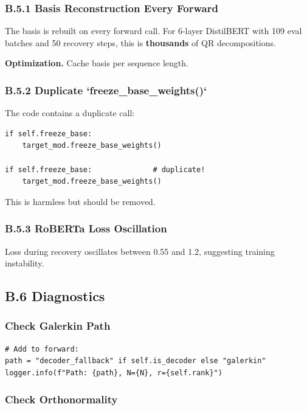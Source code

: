 \subsubsection{B.5.1 Basis Reconstruction Every Forward}

The basis is rebuilt on every forward call. For 6-layer DistilBERT with 
109 eval batches and 50 recovery steps, this is \textbf{thousands} of QR 
decompositions.

\textbf{Optimization.} Cache basis per sequence length.

\subsubsection{B.5.2 Duplicate `freeze\_base\_weights()`}

The code contains a duplicate call:

\begin{lstlisting}
if self.freeze_base:
    target_mod.freeze_base_weights()

if self.freeze_base:              # duplicate!
    target_mod.freeze_base_weights()
\end{lstlisting}

This is harmless but should be removed.

\subsubsection{B.5.3 RoBERTa Loss Oscillation}

Loss during recovery oscillates between 0.55 and 1.2, suggesting training 
instability.

\subsection{B.6 Diagnostics}

\subsubsection{Check Galerkin Path}

\begin{lstlisting}
# Add to forward:
path = "decoder_fallback" if self.is_decoder else "galerkin"
logger.info(f"Path: {path}, N={N}, r={self.rank}")
\end{lstlisting}

\subsubsection{Check Orthonormality}

